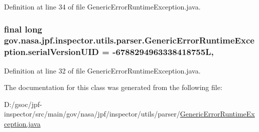 Definition at line 34 of file Generic\+Error\+Runtime\+Exception.\+java.

\subsubsection[{\texorpdfstring{serial\+Version\+U\+ID}{serialVersionUID}}]{\setlength{\rightskip}{0pt plus 5cm}final long gov.\+nasa.\+jpf.\+inspector.\+utils.\+parser.\+Generic\+Error\+Runtime\+Exception.\+serial\+Version\+U\+ID = -\/6788294963338418755L\hspace{0.3cm}{\ttfamily [static]}, {\ttfamily [private]}}\hypertarget{classgov_1_1nasa_1_1jpf_1_1inspector_1_1utils_1_1parser_1_1_generic_error_runtime_exception_abd705fbb0596bb1f7f633fa26f79a4f0}{}\label{classgov_1_1nasa_1_1jpf_1_1inspector_1_1utils_1_1parser_1_1_generic_error_runtime_exception_abd705fbb0596bb1f7f633fa26f79a4f0}


Definition at line 32 of file Generic\+Error\+Runtime\+Exception.\+java.



The documentation for this class was generated from the following file\+:\begin{DoxyCompactItemize}
\item 
D\+:/gsoc/jpf-\/inspector/src/main/gov/nasa/jpf/inspector/utils/parser/\hyperlink{_generic_error_runtime_exception_8java}{Generic\+Error\+Runtime\+Exception.\+java}\end{DoxyCompactItemize}
